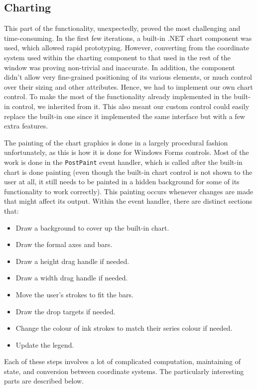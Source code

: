 	
	
	
	

	
	\subsection{Charting}
	This part of the functionality, unexpectedly, proved the most challenging and time-consuming. In the first few iterations, a built-in .NET chart component was used, which allowed rapid prototyping. However, converting from the coordinate system used within the charting component to that used in the rest of the window was proving non-trivial and inaccurate. In addition, the component didn't allow very fine-grained positioning of its various elements, or much control over their sizing and other attributes. Hence, we had to implement our own chart control. To make the most of the functionality already implemented in the built-in control, we inherited from it. This also meant our custom control could easily replace the built-in one since it implemented the same interface but with a few extra features.
	
	The painting of the chart graphics is done in a largely procedural fashion unfortunately, as this is how it is done for Windows Forms controls. Most of the work is done in the \texttt{PostPaint} event handler, which is called after the built-in chart is done painting (even though the built-in chart control is not shown to the user at all, it still needs to be painted in a hidden background for some of its functionality to work correctly). This painting occurs whenever changes are made that might affect its output. Within the event handler, there are distinct sections that:
	\begin{itemize}
	\item Draw a background to cover up the built-in chart.
	\item Draw the formal axes and bars.
	\item Draw a height drag handle if needed.
	\item Draw a width drag handle if needed.
	\item Move the user's strokes to fit the bars.
	\item Draw the drop targets if needed.
	\item Change the colour of ink strokes to match their series colour if needed. 
	\item Update the legend.
	\end{itemize}
	
	Each of these steps involves a lot of complicated computation, maintaining of state, and conversion between coordinate systems. The particularly interesting parts are described below.
	
